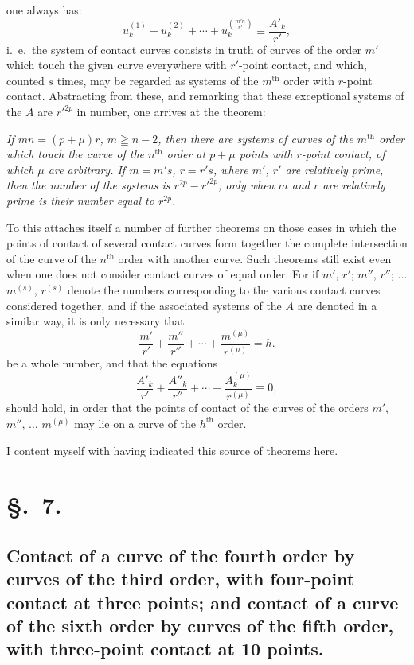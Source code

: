 \documentclass{article}
\begin{document}
one always has:
\[ u_{k}^{(1)} + u_{k}^{(2)} + \cdots + u_{k}^{\left(\frac{m'n}{r'}\right)} \equiv \frac{A'_{k}}{r'}, \]
i.\ e.\ the system of contact curves consists in truth of curves of the order $m'$ which touch the given curve everywhere with $r'$-point contact, and which, counted $s$ times, may be regarded as systems of the $m^{\text{th}}$ order with $r$-point contact. Abstracting from these, and remarking that these exceptional systems of the $A$ are $r'^{2p}$ in number, one arrives at the theorem:

\emph{If $mn = (p+\mu)r$, $m \geqq n-2$, then there are systems of curves of the $m^{\text{th}}$ order which touch the curve of the $n^{\text{th}}$ order at $p+\mu$ points with $r$-point contact, of which $\mu$ are arbitrary. If $m = m's$, $r = r's$, where $m'$, $r'$ are relatively prime, then the number of the systems is $r^{2p} - r'^{2p}$; only when $m$ and $r$ are relatively prime is their number equal to $r^{2p}$.}

To this attaches itself a number of further theorems on those cases in which the points of contact of several contact curves form together the complete intersection of the curve of the $n^{\text{th}}$ order with another curve. Such theorems still exist even when one does not consider contact curves of equal order. For if $m'$, $r'$; $m''$, $r''$; $\ldots$ $m^{(s)}$, $r^{(s)}$ denote the numbers corresponding to the various contact curves considered together, and if the associated systems of the $A$ are denoted in a similar way, it is only necessary that
\[ \frac{m'}{r'} + \frac{m''}{r''} + \cdots + \frac{m^{(\mu)}}{r^{(\mu)}} = h. \]
be a whole number, and that the equations
\[ \frac{A'_{k}}{r'} + \frac{A''_{k}}{r''} + \cdots + \frac{A_{k}^{(\mu)}}{r^{(\mu)}} \equiv 0, \]
should hold, in order that the points of contact of the curves of the orders $m'$, $m''$, $\ldots$ $m^{(\mu)}$ may lie on a curve of the $h^{\text{th}}$ order.

I content myself with having indicated this source of theorems here.

\section*{§.~7.}
\subsection*{Contact of a curve of the fourth order by curves of the third order, with four-point contact at three points; and contact of a curve of the sixth order by curves of the fifth order, with three-point contact at 10 points.}
\end{document}
